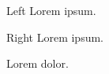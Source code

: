 \documentclass{article}
\begin{document}
\beginnumbering
\pstart
{}
\pend
\pausenumbering
\begin{pairs}  
\begin{Leftside} 
    \resumenumbering  
    \pstart  
        Left Lorem ipsum.
    \pend  
    \pausenumbering
\end{Leftside} 
\begin{Rightside}   
    \beginnumbering  
    \pstart  
        Right Lorem ipsum.
    \pend  
    \pausenumbering
\end{Rightside}  
\end{pairs}  
\Columns

\resumenumbering
\pstart  
    Lorem  dolor.
\pend  
\pausenumbering
\end{document}
